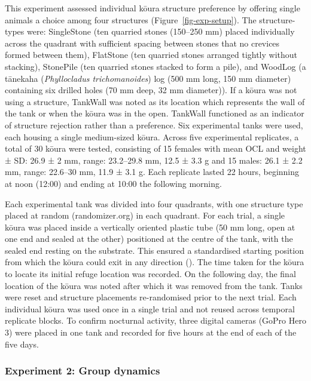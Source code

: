 \documentclass[
  letterpaper,
  DIV=11,
  numbers=noendperiod]{scrartcl}
\begin{document}
This experiment assessed individual kōura structure preference by
offering single animals a choice among four structures
(Figure~\ref{fig-exp-setup}). The structure-types were: SingleStone (ten
quarried stones (150--250 mm) placed individually across the quadrant
with sufficient spacing between stones that no crevices formed between
them), FlatStone (ten quarried stones arranged tightly without
stacking), StonePile (ten quarried stones stacked to form a pile), and
WoodLog (a tānekaha (\emph{Phyllocladus trichomanoides}) log (500 mm
long, 150 mm diameter) containing six drilled holes (70 mm deep, 32 mm
diameter)). If a kōura was not using a structure, TankWall was noted as
its location which represents the wall of the tank or when the kōura was
in the open. TankWall functioned as an indicator of structure rejection
rather than a preference. Six experimental tanks were used, each housing
a single medium-sized kōura. Across five experimental replicates, a
total of 30 kōura were tested, consisting of 15 females with mean OCL
and weight ± SD: 26.9 ± 2 mm, range: 23.2--29.8 mm, 12.5 ± 3.3 g and 15
males: 26.1 ± 2.2 mm, range: 22.6--30 mm, 11.9 ± 3.1 g. Each replicate
lasted 22 hours, beginning at noon (12:00) and ending at 10:00 the
following morning.

Each experimental tank was divided into four quadrants, with one
structure type placed at random (randomizer.org) in each quadrant. For
each trial, a single kōura was placed inside a vertically oriented
plastic tube (50 mm long, open at one end and sealed at the other)
positioned at the centre of the tank, with the sealed end resting on the
substrate. This ensured a standardised starting position from which the
kōura could exit in any direction (). The time taken for the kōura to locate its
initial refuge location was recorded. On the following day, the final
location of the kōura was noted after which it was removed from the
tank. Tanks were reset and structure placements re-randomised prior to
the next trial. Each individual kōura was used once in a single trial
and not reused across temporal replicate blocks. To confirm nocturnal
activity, three digital cameras (GoPro Hero 3) were placed in one tank
and recorded for five hours at the end of each of the five days.

\subsubsection{Experiment 2: Group
dynamics}\label{experiment-2-group-dynamics}
\end{document}
